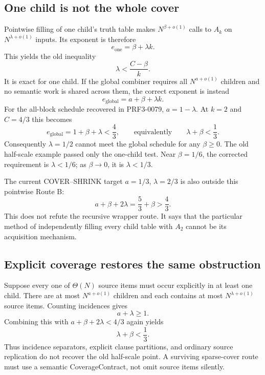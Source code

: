 \documentclass[11pt]{article}
\begin{document}
\subsection{One child is not the whole cover}
Pointwise filling of one child's truth table makes $N^{\beta+o(1)}$ calls to
$A_k$ on $N^{\lambda+o(1)}$ inputs.  Its exponent is therefore
\[
 e_{\mathrm{one}}=\beta+\lambda k.
\]
This yields the old inequality
\[
 \lambda<\frac{C-\beta}{k}.
\]
It is exact for one child.  If the global combiner requires all
$N^{a+o(1)}$ children and no semantic work is shared across them, the correct
exponent is instead
\[
 \boxed{e_{\mathrm{global}}=a+\beta+\lambda k.}
\]
For the all-block schedule recovered in PRF3-0079, $a=1-\lambda$.  At
$k=2$ and $C=4/3$ this becomes
\[
 e_{\mathrm{global}}=1+\beta+\lambda<\frac43,
 \qquad\text{equivalently}\qquad
 \boxed{\lambda+\beta<\frac13.}
\]
Consequently $\lambda=1/2$ cannot meet the global schedule for any
$\beta\ge0$.  The old half-scale example passed only the one-child test.
Near $\beta=1/6$, the corrected requirement is $\lambda<1/6$; as
$\beta\to0$, it is $\lambda<1/3$.

The current COVER--SHRINK target $a=1/3$, $\lambda=2/3$ is also outside this
pointwise Route B:
\[
 a+\beta+2\lambda=\frac53+\beta>\frac43.
\]
This does not refute the recursive wrapper route.  It says that the particular
method of independently filling every child table with $A_2$ cannot be its
acquisition mechanism.

\subsection{Explicit coverage restores the same obstruction}
Suppose every one of $\Theta(N)$ source items must occur explicitly in at
least one child.  There are at most $N^{a+o(1)}$ children and each contains at
most $N^{\lambda+o(1)}$ source items.  Counting incidences gives
\[
 a+\lambda\ge1.
\]
Combining this with $a+\beta+2\lambda<4/3$ again yields
\[
 \lambda+\beta<\frac13.
\]
Thus incidence separators, explicit clause partitions, and ordinary source
replication do not recover the old half-scale point.  A surviving sparse-cover
route must use a semantic CoverageContract, not omit source items silently.
\end{document}
